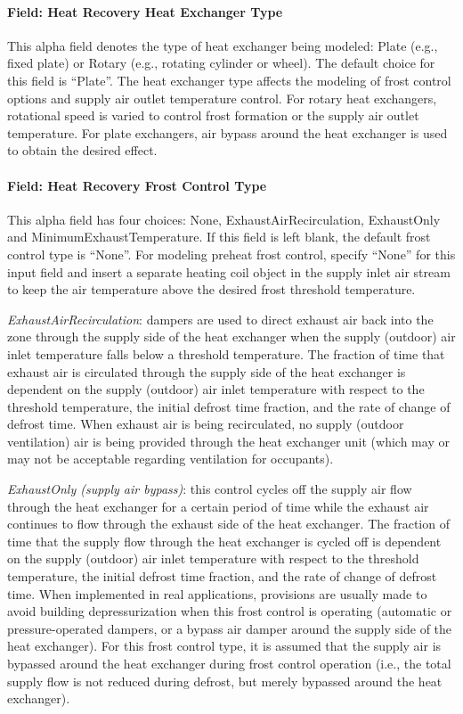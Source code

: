 \paragraph{Field: Heat Recovery Heat Exchanger Type}\label{field-heat-recovery-heat-exchanger-type-3}

This alpha field denotes the type of heat exchanger being modeled: Plate (e.g., fixed plate) or Rotary (e.g., rotating cylinder or wheel). The default choice for this field is ``Plate''. The heat exchanger type affects the modeling of frost control options and supply air outlet temperature control. For rotary heat exchangers, rotational speed is varied to control frost formation or the supply air outlet temperature. For plate exchangers, air bypass around the heat exchanger is used to obtain the desired effect.

\paragraph{Field: Heat Recovery Frost Control Type}\label{field-heat-recovery-frost-control-type-3}

This alpha field has four choices: None, ExhaustAirRecirculation, ExhaustOnly and MinimumExhaustTemperature. If this field is left blank, the default frost control type is ``None''. For modeling preheat frost control, specify ``None'' for this input field and insert a separate heating coil object in the supply inlet air stream to keep the air temperature above the desired frost threshold temperature.

\emph{ExhaustAirRecirculation}: dampers are used to direct exhaust air back into the zone through the supply side of the heat exchanger when the supply (outdoor) air inlet temperature falls below a threshold temperature. The fraction of time that exhaust air is circulated through the supply side of the heat exchanger is dependent on the supply (outdoor) air inlet temperature with respect to the threshold temperature, the initial defrost time fraction, and the rate of change of defrost time. When exhaust air is being recirculated, no supply (outdoor ventilation) air is being provided through the heat exchanger unit (which may or may not be acceptable regarding ventilation for occupants).

\emph{ExhaustOnly (supply air bypass)}: this control cycles off the supply air flow through the heat exchanger for a certain period of time while the exhaust air continues to flow through the exhaust side of the heat exchanger. The fraction of time that the supply flow through the heat exchanger is cycled off is dependent on the supply (outdoor) air inlet temperature with respect to the threshold temperature, the initial defrost time fraction, and the rate of change of defrost time. When implemented in real applications, provisions are usually made to avoid building depressurization when this frost control is operating (automatic or pressure-operated dampers, or a bypass air damper around the supply side of the heat exchanger). For this frost control type, it is assumed that the supply air is bypassed around the heat exchanger during frost control operation (i.e., the total supply flow is not reduced during defrost, but merely bypassed around the heat exchanger).

